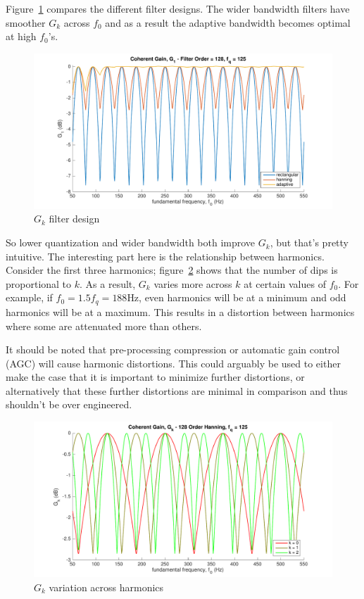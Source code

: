 \documentclass [11pt, proquest,oneside] {ganter_thesis}[2015/03/03]
\begin{document}
Figure~\ref{fig:g_k_3} compares the different filter designs.  The wider bandwidth filters have smoother $G_k$ across $f_0$ and as a result the adaptive bandwidth becomes optimal at high $f_0$'s.

\begin{figure}[!ht]
  \centering
    \includegraphics[width=.8\textwidth]{g_k_3}   
    \caption{$G_k$ filter design}\label{fig:g_k_3}
\end{figure}

So lower quantization and wider bandwidth both improve $G_k$, but that's pretty intuitive.  The interesting part here is the relationship between harmonics.  Consider the first three harmonics;  figure~\ref{fig:g_k_4} shows that the number of dips is proportional to $k$.  As a result, $G_k$ varies more across $k$ at certain values of $f_0$.  For example, if $f_0 = 1.5f_q = 188$Hz, even harmonics will be at a minimum and odd harmonics will be at a maximum.  This results in a distortion between harmonics where some are attenuated more than others.

It should be noted that pre-processing compression or automatic gain control (AGC) will cause harmonic distortions.  This could arguably be used to either make the case that it is important to minimize further distortions, or alternatively that these further distortions are minimal in comparison and thus shouldn't be over engineered.

\begin{figure}[!ht]
  \centering
    \includegraphics[width=1\textwidth]{g_k_4}   
    \caption{$G_k$ variation across harmonics}\label{fig:g_k_4}
\end{figure}
\end{document}
